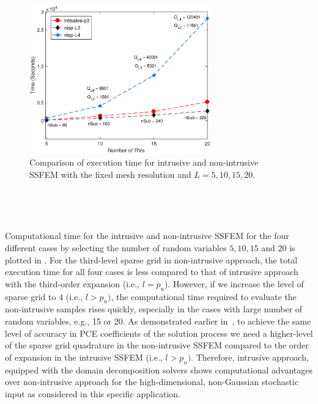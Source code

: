 \documentclass[letter,1p,11pt,oneside,onecolumn,sort&compress]{elsarticle}
\begin{document}
\begin{figure}[htbp]
 \centering
 \includegraphics[width=0.7\textwidth,height=0.38\textheight]{plots/timeVnRVs_intruVnisp.eps}
 \caption{Comparison of execution time for intrusive and non-intrusive SSFEM with the fixed mesh resolution and $L = 5, 10, 15, 20$.}
 \label{fig:TimeVnRVs_intruVnisp}
\end{figure}

\

\

Computational time for the intrusive and non-intrusive SSFEM for the four different cases by selecting the number of random variables $5, 10, 15$ and $20$ is plotted in .
For the third-level sparse grid in non-intrusive approach, the total execution time for all four cases is less compared to that of intrusive approach with the third-order expansion (i.e., $l=p_{u}$). However, if we increase the level of sparse grid to $4$ (i.e., $l>p_{u})$, the computational time required to evaluate the non-intrusive samples rises quickly, especially in the cases with large number of random variables, e.g., 15 or 20.  As demonstrated earlier in~, %
to achieve the same level of accuracy in PCE coefficients of the solution process we need a higher-level of the sparse grid quadrature in the non-intrusive SSFEM compared to the order of expansion in the intrusive SSFEM (i.e., $l>p_{u})$.
Therefore, intrusive approach, equipped with the domain decomposition solvers shows computational advantages over non-intrusive approach for the high-dimensional, non-Gaussian stochastic input as considered in this specific application.
\end{document}
